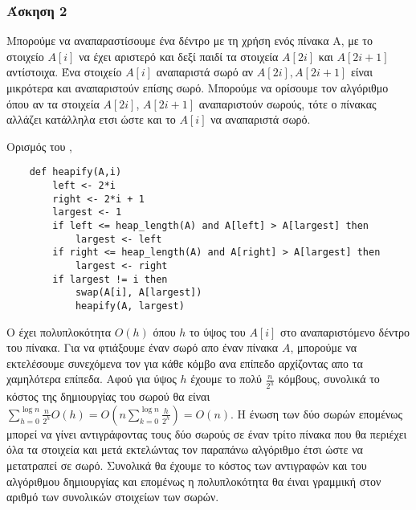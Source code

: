 \newpage

\subsubsection*{Άσκηση 2}

Μπορούμε να αναπαραστίσουμε ένα δέντρο με τη χρήση ενός πίνακα A, με το στοιχείο $A[i]$ να έχει αριστερό και δεξί παιδί τα στοιχεία $Α[2i]$ και $Α[2i+1]$ αντίστοιχα.
Ένα στοιχείο $A[i]$ αναπαριστά σωρό αν $A[2i], A[2i+1]$ είναι μικρότερα και αναπαριστούν επίσης σωρό. 
Μπορούμε να ορίσουμε τον αλγόριθμο  όπου αν τα στοιχεία $A[2i]$, $A[2i+1]$ αναπαριστούν σωρούς, τότε ο πίνακας αλλάζει κατάλληλα ετσι ώστε και το $A[i]$ 
να αναπαριστά σωρό. 

Ορισμός του ,

\begin{verbatim}
    def heapify(A,i)
        left <- 2*i
        right <- 2*i + 1
        largest <- 1
        if left <= heap_length(A) and A[left] > A[largest] then
            largest <- left
        if right <= heap_length(A) and A[right] > A[largest] then
            largest <- right
        if largest != i then
            swap(A[i], A[largest])
            heapify(A, largest)
\end{verbatim}

Ο  έχει πολυπλοκότητα $O(h)$ όπου $h$ το ύψος του $A[i]$ στο αναπαριστόμενο δέντρο του πίνακα.
Για να φτιάξουμε έναν σωρό απο έναν πίνακα $A$, μπορούμε να εκτελέσουμε συνεχόμενα τον  για κάθε κόμβο ανα επίπεδο αρχίζοντας απο τα χαμηλότερα επίπεδα.
Αφού για ύψος $h$ έχουμε το πολύ $\frac{n}{2^h}$ κόμβους, συνολικά το κόστος της δημιουργίας του σωρού θα είναι $\sum_{h=0}^{\log n} \frac{n}{2^h}O(h) = O(n\sum_{k=0}^{\log n} \frac{h}{2^h}) = O(n)$.
Η ένωση των δύο σωρών επομένως μπορεί να γίνει αντιγράφοντας τους δύο σωρούς σε έναν τρίτο πίνακα που θα περιέχει όλα τα στοιχεία και μετά εκτελώντας τον παραπάνω αλγόριθμο έτσι ώστε να μετατραπεί σε σωρό.
Συνολικά θα έχουμε το κόστος των αντιγραφών και του αλγόριθμου δημιουργίας και επομένως η πολυπλοκότητα θα έιναι γραμμική στον αριθμό των συνολικών στοιχείων των σωρών.


